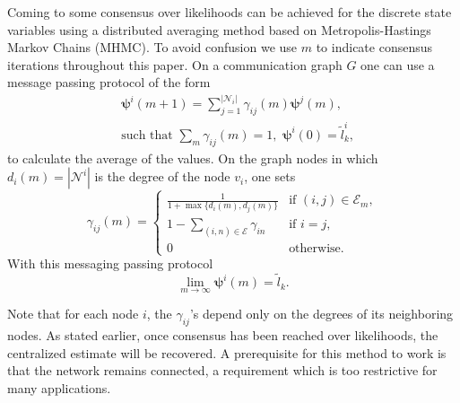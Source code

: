 \documentclass[journal]{IEEEtran}
\newcommand{\vect}[1]{{\mathbf{#1}}}
\theoremstyle{remark}
\theoremstyle{definition}
\begin{document}
Coming to some consensus over likelihoods can be achieved for the discrete state variables using a distributed averaging method based on Metropolis-Hastings Markov Chains (MHMC). To avoid confusion we use $m$ to indicate consensus iterations throughout this paper. On a communication graph $G$ one can use a message passing protocol of the form 
\begin{align}
&\vect{\psi}^i(m+1)=\textstyle {\sum\nolimits _{j=1}^{|\mathcal{N}_{i}|}} \gamma_{ij}(m)\vect{\psi}^j(m),\\
& \text{such that } \sum_{m}  \gamma_{ij}(m) = 1,\,\,  \vect{\psi}^i(0)=  \tilde{l}_k^i,\nonumber
\end{align}
to calculate the average of the values.
On the graph nodes in which $d_{i}(m)=|\mathcal{N}^i|$ is the degree of the node $v_i$, 
one sets
\begin{equation}
\label{eq:mhmc}
\gamma_{ij}(m) =
\begin{cases}
{\frac{1}{1+\max\{d_{i}(m),d_{j}(m)\}}}      &  \text{if } (i,j) \in \mathcal{E}_{m}, \\
1-\sum\limits_{{(i,n)} \in \mathcal{E}}\gamma_{in}  &  \text{if } i = j,\\
0 & \text{otherwise}.
\end{cases}
\end{equation}
With this messaging passing protocol $$\lim_{m\rightarrow \infty} \vect{\psi}^i(m) = \tilde{l}_k.$$

Note that for each node $i$, the $\gamma_{ij}$'s depend only on the degrees of
its neighboring nodes. As stated earlier, once consensus has been reached over
likelihoods, the centralized estimate will be recovered. A prerequisite for
this method to work is that the network remains connected, a 
requirement which is too restrictive for many applications.
\end{document}
